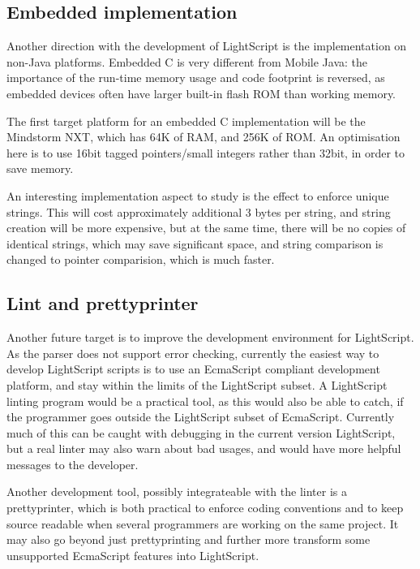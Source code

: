 \documentclass[11pt]{report}
\begin{document}
\subsection{Embedded implementation}

Another direction with the development of LightScript is the implementation on non-Java platforms.
Embedded C is very different from Mobile Java: the importance of the run-time memory usage and code footprint is reversed, as embedded devices often have larger built-in flash ROM than working memory.

The first target platform for an embedded C implementation will be the Mindstorm NXT, which has 64K of RAM, and 256K of ROM.
An optimisation here is to use 16bit tagged pointers/small integers rather than 32bit, in order to save memory. 

An interesting implementation aspect to study is the effect to enforce unique strings. This will cost approximately additional 3 bytes per string, and string creation will be more expensive, but at the same time, there will be no copies of identical strings, which may save significant space, and string comparison is changed to pointer comparision, which is much faster.

\subsection{Lint and prettyprinter}

Another future target is to improve the development environment for LightScript.
As the parser does not support error checking, currently the easiest way to develop LightScript scripts is to use an EcmaScript compliant development platform, and stay within the limits of the LightScript subset.
A LightScript linting program would be a practical tool, as this would also be able to catch, if the programmer goes outside the LightScript subset of EcmaScript.
Currently much of this can be caught with debugging in the current version LightScript, but a real linter may also warn about bad usages, and would have more helpful messages to the developer.

Another development tool, possibly integrateable with the linter is a prettyprinter, which is both practical to enforce coding conventions and to keep source readable when several programmers are working on the same project. It may also go beyond just prettyprinting and further more transform some unsupported EcmaScript features into LightScript.
\end{document}
